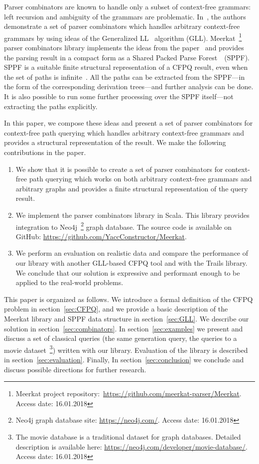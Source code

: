 Parser combinators are known to handle only a subset of context-free grammars: left recursion and ambiguity of the grammars are problematic.
In~\cite{Meerkat}, the authors demonstrate a set of parser combinators which handles arbitrary context-free grammars by using ideas of the Generalized LL~\cite{scott2010gll} algorithm (GLL).
Meerkat~\footnote{Meerkat project repository:~\url{https://github.com/meerkat-parser/Meerkat}. Access date: 16.01.2018} parser combinators library implements the ideas from the paper~\cite{Meerkat} and provides the parsing result in a compact form as a Shared Packed Parse Forest~\cite{SPPF}~(SPPF).
SPPF is a suitable finite structural representation of a CFPQ result, even when the set of paths is infinite~\cite{GrigorevR16}.
All the paths can be extracted from the SPPF---in the form of the corresponding derivation trees---and further analysis can be done.
It is also possible to run some further processing over the SPPF itself---not extracting the paths explicitly.

In this paper, we compose these ideas and present a set of parser combinators for context-free path querying which handles arbitrary context-free grammars and provides a structural representation of the result.
We make the following contributions in the paper.

\begin{enumerate}
\item We show that it is possible to create a set of parser combinators for context-free path querying which works on both arbitrary context-free grammars and arbitrary graphs and provides a finite structural representation of the query result.
\item We implement the parser combinators library in Scala. This library provides integration to Neo4j~\footnote{Neo4j graph database site: \url{https://neo4j.com/}. Access date: 16.01.2018} graph database. The source code is available on GitHub: \url{https://github.com/YaccConstructor/Meerkat}.
\item We perform an evaluation on realistic data and compare the performance of our library with another GLL-based CFPQ tool and with the Trails library.
We conclude that our solution is expressive and performant enough to be applied to the real-world problems.
\end{enumerate}

This paper is organized as follows.
We introduce a formal definition of the CFPQ problem in section~\ref{sec:CFPQ}, and we provide a basic description of the Meerkat library and SPPF data structure in section~\ref{sec:GLL}.
We describe our solution in section~\ref{sec:combinators}.
In section~\ref{sec:examples} we present and discuss a set of classical queries (the same generation query, the queries to a movie dataset~\footnote{The movie database is a traditional dataset for graph databases. Detailed description is available here: \url{https://neo4j.com/developer/movie-database/}. Access date: 16.01.2018})
written with our library.
Evaluation of the library is described in section~\ref{sec:evaluation}.
Finally, In section~\ref{sec:conclusion} we conclude and discuss possible directions for further research.
